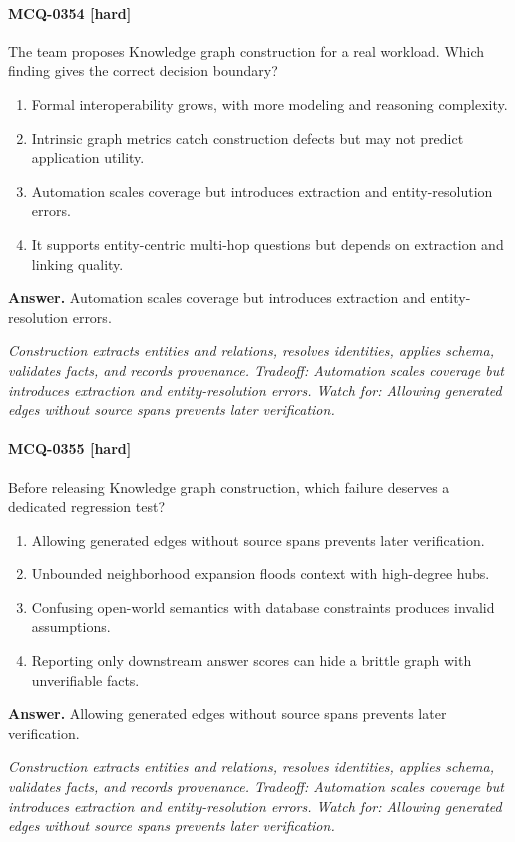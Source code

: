 \paragraph{MCQ-0354 [hard]} The team proposes Knowledge graph construction for a real workload. Which finding gives the correct decision boundary?
\begin{enumerate}[label=\Alph*.]
\item Formal interoperability grows, with more modeling and reasoning complexity.
\item Intrinsic graph metrics catch construction defects but may not predict application utility.
\item Automation scales coverage but introduces extraction and entity-resolution errors.
\item It supports entity-centric multi-hop questions but depends on extraction and linking quality.
\end{enumerate}
\noindent\textbf{Answer.} Automation scales coverage but introduces extraction and entity-resolution errors.
\par\textit{Construction extracts entities and relations, resolves identities, applies schema, validates facts, and records provenance. Tradeoff: Automation scales coverage but introduces extraction and entity-resolution errors. Watch for: Allowing generated edges without source spans prevents later verification.}
\paragraph{MCQ-0355 [hard]} Before releasing Knowledge graph construction, which failure deserves a dedicated regression test?
\begin{enumerate}[label=\Alph*.]
\item Allowing generated edges without source spans prevents later verification.
\item Unbounded neighborhood expansion floods context with high-degree hubs.
\item Confusing open-world semantics with database constraints produces invalid assumptions.
\item Reporting only downstream answer scores can hide a brittle graph with unverifiable facts.
\end{enumerate}
\noindent\textbf{Answer.} Allowing generated edges without source spans prevents later verification.
\par\textit{Construction extracts entities and relations, resolves identities, applies schema, validates facts, and records provenance. Tradeoff: Automation scales coverage but introduces extraction and entity-resolution errors. Watch for: Allowing generated edges without source spans prevents later verification.}
